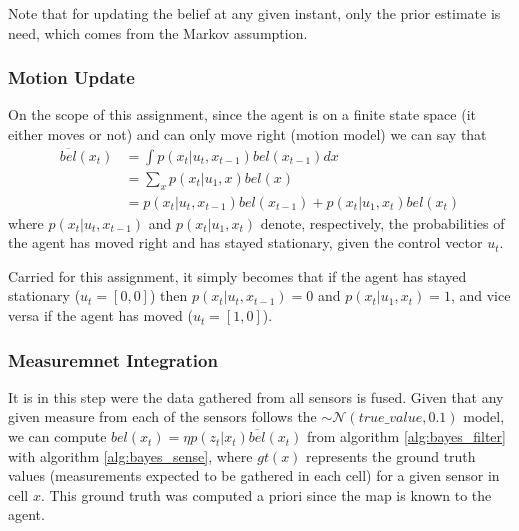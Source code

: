 \documentclass[runningheads]{llncs}
\begin{document}
Note that for updating the belief at any given instant, only the prior estimate is need, which comes from the Markov assumption.

\subsubsection{Motion Update}

On the scope of this assignment, since the agent is on a finite state space (it either moves or not) and can only move right (motion model) we can say that
%
\begin{equation*} 
    \label{eq1}
    \begin{split}
        \overline{bel}(x_t) &= \int p(x_t \vert u_t, x_{t-1}) bel(x_{t-1}) dx \\
        & = \sum_{x} p(x_t \vert u_1, x) bel(x) \\
        & = p(x_t \vert u_t, x_{t-1}) bel(x_{t-1}) + p(x_t \vert u_1, x_t) bel(x_t)
    \end{split}
\end{equation*}
%
where $p(x_t \vert u_t, x_{t-1})$ and $p(x_t \vert u_1, x_t)$ denote, respectively, the probabilities of the agent has moved right and has stayed stationary, given the control vector $u_t$.

Carried for this assignment, it simply becomes that if the agent has stayed stationary ($u_t = [0, 0]$) then $p(x_t \vert u_t, x_{t-1}) = 0$ and $p(x_t \vert u_1, x_t) = 1$, and vice versa if the agent has moved ($u_t = [1, 0]$).

\subsubsection{Measuremnet Integration}

It is in this step were the data gathered from all sensors is fused. Given that any given measure from each of the sensors follows the $\sim\mathcal{N}(true\_value, 0.1)$ model, we can compute $bel(x_t) = \eta p(z_t \vert x_t) \overline{bel}(x_t)$ from algorithm \ref{alg:bayes_filter} with algorithm \ref{alg:bayes_sense}, where $gt(x)$ represents the ground truth values (measurements expected to be gathered in each cell) for a given sensor in cell $x$. This ground truth was computed a priori since the map is known to the agent.
\end{document}
